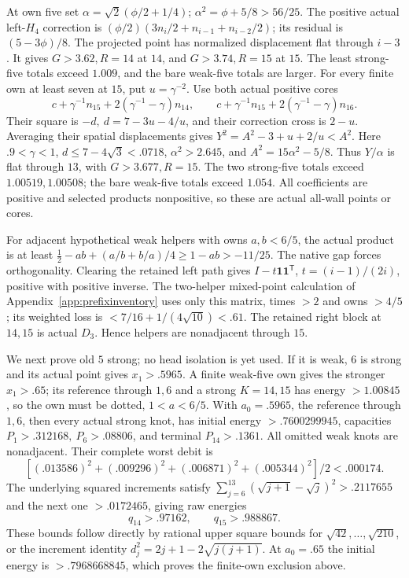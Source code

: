 \documentclass[11pt]{article}
\theoremstyle{definition}
\theoremstyle{remark}
\begin{document}
At own five set \(\alpha=\sqrt2(\phi/2+1/4)\);
\(\alpha^2=\phi+5/8>56/25\).
The positive actual left-\(H_4\) correction is
\((\phi/2)(3n_i/2+n_{i-1}+n_{i-2}/2)\);
its residual is \((5-3\phi)/8\).
The projected point has normalized displacement flat through \(i-3\).
It gives \(G>3.62,R=14\) at \(14\), and \(G>3.74,R=15\)
at \(15\). The least strong-five totals exceed \(1.009\),
and the bare weak-five totals are larger.
For every finite own at least seven at \(15\), put \(u=\gamma^{-2}\).
Use both actual positive cores
\[
 c+\gamma^{-1}n_{15}+2(\gamma^{-1}-\gamma)n_{14},
 \qquad
 c+\gamma^{-1}n_{15}+2(\gamma^{-1}-\gamma)n_{16}.
\]
Their square is \(-d,\ d=7-3u-4/u\), and their correction
cross is \(2-u\).
Averaging their spatial displacements gives
\(Y^2=A^2-3+u+2/u<A^2\).
Here \(.9<\gamma<1\), \(d\leq7-4\sqrt3<.0718\),
\(\alpha^2>2.645\), and
\(A^2=15\alpha^2-5/8\).
Thus \(Y/\alpha\) is flat through \(13\), with
\(G>3.677,R=15\).
The two strong-five totals exceed \(1.00519,1.00508\);
the bare weak-five totals exceed \(1.054\).
All coefficients are positive and selected products nonpositive,
so these are actual all-wall points or cores.

For adjacent hypothetical weak helpers with owns \(a,b<6/5\),
the actual product is at least
\(\tfrac12-ab+(a/b+b/a)/4\geq1-ab>-11/25\).
The native gap forces orthogonality.
Clearing the retained left path gives
\(I-t\mathbf1\mathbf1^{\mathsf T}\), \(t=(i-1)/(2i)\),
positive with positive inverse.
The two-helper mixed-point calculation of
Appendix~\ref{app:prefixinventory} uses only this matrix, times \(>2\)
and owns \(>4/5\); its weighted loss is
\(<7/16+1/(4\sqrt{10})<.61\).
The retained right block at \(14,15\) is actual \(D_3\).
Hence helpers are nonadjacent through \(15\).

We next prove old \(5\) strong; no head isolation is yet used.
If it is weak, \(6\) is strong and its actual point gives
\(x_1>.5965\). A finite weak-five own gives the stronger \(x_1>.65\);
its reference through \(1,6\) and a strong \(K=14,15\) has energy
\(>1.00845\), so the own must be dotted, \(1<a<6/5\).
With \(a_0=.5965\), the reference through \(1,6\), then every actual
strong knot, has initial energy \(>.7600299945\),
capacities \(P_1>.312168,\ P_6>.08806\), and terminal
\(P_{14}>.1361\).
All omitted weak knots are nonadjacent. Their complete worst debit is
\[
 [(.013586)^2+(.009296)^2+(.006871)^2+(.005344)^2]/2
 <.000174 .
\]
The underlying squared increments satisfy
\(\sum_{j=6}^{13}(\sqrt{j+1}-\sqrt j)^2>.2117655\)
and the next one \(>.0172465\), giving raw energies
\[
 q_{14}>.97162,\qquad q_{15}>.988867.
\]
These bounds follow directly by rational upper square bounds for
\(\sqrt{42},\ldots,\sqrt{210}\), or the increment identity
\(d_j^2=2j+1-2\sqrt{j(j+1)}\).
At \(a_0=.65\) the initial energy is \(>.7968668845\),
which proves the finite-own exclusion above.
\end{document}
